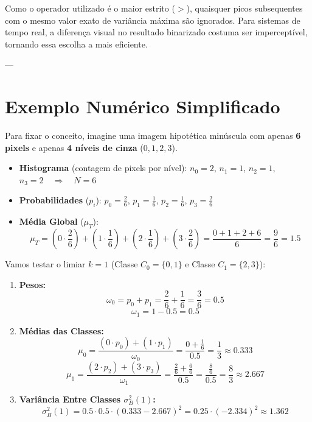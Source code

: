 \documentclass[12pt, a4paper]{article}
\begin{document}
Como o operador utilizado é o maior estrito ($>$), quaisquer picos subsequentes com o mesmo valor exato de variância máxima são ignorados. Para sistemas de tempo real, a diferença visual no resultado binarizado costuma ser imperceptível, tornando essa escolha a mais eficiente.

---

\section{Exemplo Numérico Simplificado}

Para fixar o conceito, imagine uma imagem hipotética minúscula com apenas \textbf{6 pixels} e apenas \textbf{4 níveis de cinza} ($0, 1, 2, 3$).

\begin{itemize}
    \item \textbf{Histograma} (contagem de pixels por nível):
    $n_0 = 2$, $n_1 = 1$, $n_2 = 1$, $n_3 = 2 \quad \Rightarrow \quad N = 6$
    \item \textbf{Probabilidades} ($p_i$):
    $p_0 = \frac{2}{6}$, $p_1 = \frac{1}{6}$, $p_2 = \frac{1}{6}$, $p_3 = \frac{2}{6}$
    \item \textbf{Média Global} ($\mu_T$):
    \[ \mu_T = \left(0 \cdot \frac{2}{6}\right) + \left(1 \cdot \frac{1}{6}\right) + \left(2 \cdot \frac{1}{6}\right) + \left(3 \cdot \frac{2}{6}\right) = \frac{0 + 1 + 2 + 6}{6} = \frac{9}{6} = 1.5 \]
\end{itemize}

Vamos testar o limiar \textbf{$k = 1$} (Classe $C_0 = \{0, 1\}$ e Classe $C_1 = \{2, 3\}$):

\begin{enumerate}
    \item \textbf{Pesos:}
    \[ \omega_0 = p_0 + p_1 = \frac{2}{6} + \frac{1}{6} = \frac{3}{6} = 0.5 \]
    \[ \omega_1 = 1 - 0.5 = 0.5 \]
    
    \item \textbf{Médias das Classes:}
    \[ \mu_0 = \frac{(0 \cdot p_0) + (1 \cdot p_1)}{\omega_0} = \frac{0 + \frac{1}{6}}{0.5} = \frac{1}{3} \approx 0.333 \]
    \[ \mu_1 = \frac{(2 \cdot p_2) + (3 \cdot p_3)}{\omega_1} = \frac{\frac{2}{6} + \frac{6}{6}}{0.5} = \frac{\frac{8}{6}}{0.5} = \frac{8}{3} \approx 2.667 \]
    
    \item \textbf{Variância Entre Classes $\sigma_B^2(1)$:}
    \[ \sigma_B^2(1) = 0.5 \cdot 0.5 \cdot (0.333 - 2.667)^2 = 0.25 \cdot (-2.334)^2 \approx 1.362 \]
\end{enumerate}
\end{document}
